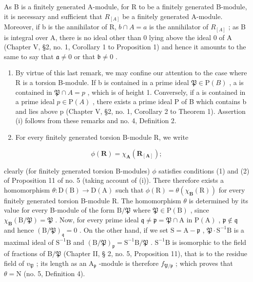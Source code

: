 As B is a finitely generated A-module, for R to be a finitely generated B-module, it is necessary and sufficient that \(R_{[A]}\) be a finitely generated A-module. Moreover, if b is the annihilator of R, \(b \cap A = a\) is the annihilator of \(R_{[A]}\) ; as B is integral over A, there is no ideal other than 0 lying above the ideal 0 of A (Chapter V, §2, no. 1, Corollary 1 to Proposition 1) and hence it amounts to the same to say that \(\mathfrak{a} \neq 0\) or that \(\mathfrak{b} \neq 0\) .

\begin{enumerate}
\def\labelenumi{(\roman{enumi})}
\item
  By virtue of this last remark, we may confine our attention to the case where R is a torsion B-module. If b is contained in a prime ideal \(\mathfrak{P} \in \mathrm{P}(B)\) , a is contained in \(\mathfrak{P} \cap A = p\) , which is of height 1. Conversely, if a is contained in a prime ideal \(p \in \mathrm{P}(A)\) , there exists a prime ideal P of B which contains b and lies above p (Chapter V, §2, no. 1, Corollary 2 to Theorem 1). Assertion (i) follows from these remarks and no. 4, Definition 2.
\item
  For every finitely generated torsion B-module R, we write
\end{enumerate}

\[
\phi (\mathbf {R}) = \chi_ {\mathbf {A}} (\mathbf {R} _ {[ \mathbf {A} ]});
\]

clearly (for finitely generated torsion B-modules) \(\phi\) satisfies conditions (1) and (2) of Proposition 11 of no. 5 (taking account of (i)). There therefore exists a homomorphism \(\theta: \mathrm{D}(\mathrm{B}) \to \mathrm{D}(\mathrm{A})\) such that \(\phi(\mathrm{R}) = \theta(\chi_{\mathbf{B}}(\mathrm{R}))\) for every finitely generated torsion B-module R. The homomorphism \(\theta\) is determined by its value for every B-module of the form \(\mathrm{B}/\mathfrak{P}\) where \(\mathfrak{P} \in \mathrm{P}(\mathrm{B})\) , since \(\chi_{\mathbf{B}}(\mathrm{B}/\mathfrak{P}) = \mathfrak{P}\) . Now, for every prime ideal \(\mathfrak{q} \neq \mathfrak{p} = \mathfrak{P} \cap \mathrm{A}\) in \(\mathrm{P}(\mathrm{A})\) , \(\mathfrak{p} \notin \mathfrak{q}\) and hence \((\mathrm{B}/\mathfrak{P})_{\mathfrak{q}} = 0\) . On the other hand, if we set \(\mathrm{S} = \mathrm{A} - \mathfrak{p}\) , \(\mathfrak{P} \cdot \mathrm{S}^{-1}\mathrm{B}\) is a maximal ideal of \(\mathrm{S}^{-1}\mathrm{B}\) and \((\mathrm{B}/\mathfrak{P})_{\mathfrak{p}} = \mathrm{S}^{-1}\mathrm{B}/\mathfrak{P}\) . \(\mathrm{S}^{-1}\mathrm{B}\) is isomorphic to the field of fractions of \(\mathrm{B}/\mathfrak{P}\) (Chapter II, § 2, no. 5, Proposition 11), that is to the residue field of \(v_{\mathfrak{P}}\) ; its length as an \(\mathrm{A}_{\mathfrak{p}}\) -module is therefore \(f_{\mathfrak{P}/\mathfrak{p}}\) ; which proves that \(\theta = \mathrm{N}\) (no. 5, Definition 4).


